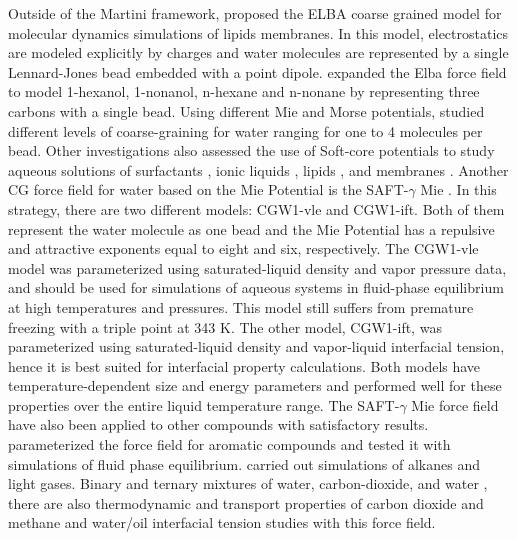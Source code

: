 Outside of the Martini framework,  proposed the ELBA coarse grained model for molecular dynamics simulations of lipids membranes. In this model, electrostatics are modeled explicitly by charges and water molecules are represented by a single Lennard-Jones bead embedded with a point dipole.  expanded the Elba force field to model 1-hexanol, 1-nonanol, n-hexane and n-nonane by representing three carbons with a single bead. Using  different Mie and Morse potentials,  studied different levels of coarse-graining for water ranging for one to 4 molecules per bead. Other investigations also assessed the use of Soft-core potentials to study aqueous solutions of surfactants \cite{shinoda2007}, ionic liquids \cite{bhargava2009}, lipids \cite{shinoda20102}, and membranes \cite{pantano2009}. Another CG force field for water based on the Mie Potential is the SAFT-$\gamma$ Mie \cite{lobanova2015}. In this strategy, there are two different models: CGW1-vle and CGW1-ift. Both of them represent the water molecule as one bead and  the Mie Potential has a repulsive and attractive exponents equal to eight and six, respectively. The CGW1-vle model was parameterized using saturated-liquid density and vapor pressure data, and should be used for simulations of aqueous systems in fluid-phase equilibrium at high temperatures and pressures. This model still suffers from premature freezing with a triple point at 343 K. The other model, CGW1-ift, was parameterized using saturated-liquid density and vapor-liquid interfacial tension, hence it is best suited for interfacial property calculations. Both models have temperature-dependent size and energy parameters and performed well for these properties over the entire liquid temperature range. The SAFT-$\gamma$ Mie force field have also been applied to other compounds with satisfactory results.  parameterized the force field for aromatic compounds and tested it with simulations of fluid phase equilibrium.  carried out simulations of alkanes and light gases. Binary and ternary mixtures of water, carbon-dioxide, and water \cite{lobanova2016}, there are also thermodynamic and transport properties of carbon dioxide and methane \cite{cassiano1,cassiano2} and water/oil interfacial tension \cite{herdes2017} studies with this force field.  




